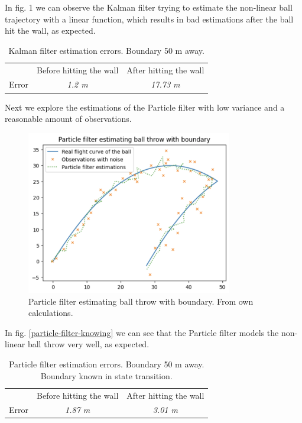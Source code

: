 \documentclass[conference]{IEEEtran}
\begin{document}
In fig. 1 we can observe the Kalman filter trying to estimate the non-linear ball trajectory with a linear function, which results in bad estimations after the ball hit the wall, as expected. 

\begin{table}[htbp]
    \caption{Kalman filter estimation errors. Boundary 50 m away.}
    \begin{center}
    \begin{tabular}{|c|c|c|}
    \cline{1-3}
    & Before hitting the wall & After hitting the wall \\
    \cline{1-3} 
    Error & \textit{1.2 m} & \textit{17.73 m} \\
    \hline
    \end{tabular}
    \label{tab1}
    \end{center}
\end{table}
Next we explore the estimations of the Particle filter with low variance and a reasonable amount of observations.

\begin{figure}[h]
\centerline{\includegraphics[width=90mm]{figs/particle-filter-knowing.png}}
\caption{Particle filter estimating ball throw with boundary. From own calculations.}
\label{fig:particle-filter-knowing}
\end{figure}

In fig. \ref{particle-filter-knowing} we can see that the Particle filter models the non-linear ball throw very well, as expected.
\begin{table}[htbp]
    \caption{Particle filter estimation errors. Boundary 50 m away. Boundary known in state transition.}
    \begin{center}
    \begin{tabular}{|c|c|c|}
    \cline{1-3}
    & Before hitting the wall & After hitting the wall \\
    \cline{1-3} 
    Error & \textit{1.87 m} & \textit{3.01 m} \\
    \hline
    \end{tabular}
    \label{tab1}
    \end{center}
\end{table}
\end{document}
